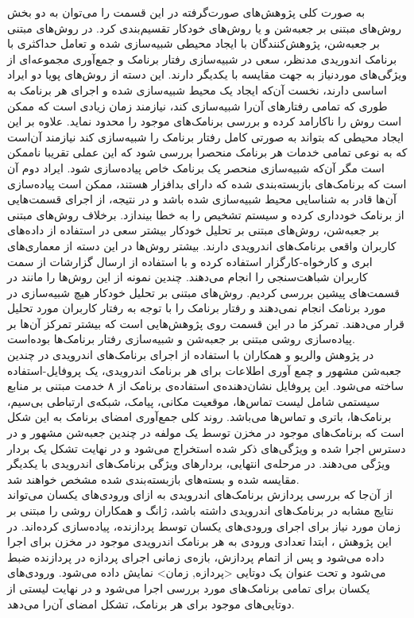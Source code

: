 به صورت کلی پژوهش‌های صورت‌گرفته  در این قسمت را می‌توان به دو بخش روش‌های مبتنی بر جعبه‌شن‌ و یا روش‌های خودکار تقسیم‌بندی کرد. در روش‌های مبتنی بر جعبه‌شن، پژوهش‌کنندگان با ایجاد محیطی شبیه‌سازی شده و تعامل حداکثری با برنامک اندوریدی مدنظر، سعی در شبیه‌سازی رفتار برنامک و جمع‌آوری مجموعه‌ای از ویژگی‌های موردنیاز به جهت مقایسه‌ با یکدیگر دارند. این دسته از روش‌های پویا دو ایراد اساسی دارند، نخست آن‌که ایجاد یک محیط شبیه‌سازی شده و اجرای هر برنامک به طوری که تمامی رفتار‌های آن‌‌را شبیه‌سازی کند، نیازمند زمان زیادی است که ممکن است روش را ناکارامد کرده و بررسی برنامک‌های موجود را محدود نماید. علاوه بر این ایجاد محیطی که بتواند به صورتی کامل رفتار برنامک را شبیه‌سازی کند نیازمند آن‌است که به نوعی تمامی خدمات هر برنامک منحصرا بررسی شود که این عملی تقریبا ناممکن است مگر آن‌که شبیه‌سازی منحصر یک برنامک خاص پیاده‌سازی شود. ایراد دوم آن‌ است که برنامک‌های بازبسته‌بندی شده که دارای بدافزار هستند، ممکن است پیاده‌سازی آن‌ها قادر به شناسایی محیط شبیه‌سازی شده باشد و در نتیجه، از اجرای قسمت‌هایی از برنامک خودداری کرده و سیستم تشخیص را به خطا بیندازد. برخلاف روش‌های مبتنی بر جعبه‌شن، روش‌های مبتنی بر تحلیل خودکار بیشتر سعی در استفاده از داده‌های کاربران واقعی برنامک‌های اندرویدی دارند. بیشتر روش‌ها در این دسته از معماری‌های ابری و کارخواه-کارگزار استفاده کرده و با استفاده از ارسال گزارشات‌ از سمت کاربران شباهت‌سنجی را انجام می‌دهند.
 چندین نمونه از این روش‌ها را مانند  در قسمت‌های پیشین بررسی کردیم. روش‌های مبتنی بر تحلیل خود‌کار هیچ شبیه‌سازی در مورد برنامک انجام نمی‌دهند و رفتار برنامک را با توجه به رفتار کاربران مورد تحلیل قرار می‌دهند. تمرکز ما در این قسمت روی پژوهش‌هایی است که بیشتر تمرکز آن‌ها بر پیاده‌سازی روشی مبتنی بر جعبه‌شن و شبیه‌سازی رفتار برنامک‌ها بوده‌است.\\
در پژوهش والریو و همکاران با استفاده از اجرای برنامک‌های اندرویدی در چندین جعبه‌شن مشهور و چمع آوری اطلاعات برای هر برنامک اندرویدی، یک پروفایل-استفاده‌ ساخته می‌شود. این پروفایل نشان‌دهنده‌ی استفاده‌ی برنامک از ۸ خدمت مبتنی بر منابع سیستمی شامل لیست‌ تماس‌ها، موقعیت‌ مکانی، پیامک‌‌، شبکه‌ی ارتباطی‌ بی‌سیم‌، برنامک‌ها، باتری و تماس‌ها می‌باشد. روند کلی جمع‌آوری امضا‌ی برنامک به این شکل است که برنامک‌های موجود در مخزن توسط یک مولفه در چندین جعبه‌شن مشهور و در دسترس اجرا شده و ویژگی‌های ذکر شده استخراج می‌شود و در نهایت تشکل یک بردار ویژگی می‌دهند. در مرحله‌ی انتهایی، بردار‌های ویژگی برنامک‌های اندرویدی با یکدیگر مقایسه شده و بسته‌های بازبسته‌بندی شده مشخص خواهند شد.\\
از آن‌جا که بررسی پردازش‌ برنامک‌های اندرویدی به ازای ورودی‌های یکسان می‌تواند نتایج مشابه در برنامک‌های اندرویدی داشته باشد، ژانگ و همکاران روشی را مبتنی بر زمان مورد نیاز برای اجرای ورودی‌های یکسان توسط پردازنده‌، پیاده‌سازی کرده‌اند. در این پژوهش ، ابتدا تعدادی ورودی به هر برنامک اندرویدی موجود در مخزن برای اجرا داده می‌شود و پس از اتمام پردازش، بازه‌ی زمانی اجرای پردازه در پردازنده ضبط می‌شود و تحت عنوان یک دوتایی <پردازه, زمان> نمایش داده می‌شود. ورودی‌های یکسان برای تمامی برنامک‌های مورد بررسی اجرا می‌شود و در نهایت لیستی از دوتایی‌های موجود برای هر برنامک، تشکل امضای آن‌‌را می‌دهد. \\
